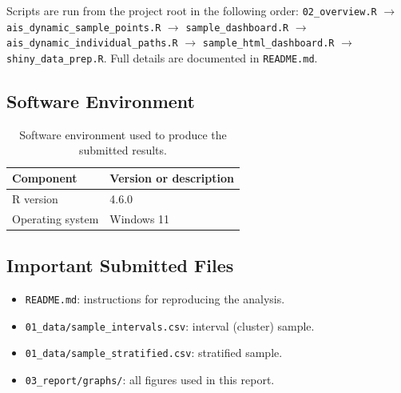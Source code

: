 \documentclass[11pt,a4paper]{article}
\begin{document}
Scripts are run from the project root in the following order:
\texttt{02\_overview.R} $\rightarrow$ \texttt{ais\_dynamic\_sample\_points.R}
$\rightarrow$ \texttt{sample\_dashboard.R} $\rightarrow$
\texttt{ais\_dynamic\_individual\_paths.R} $\rightarrow$
\texttt{sample\_html\_dashboard.R} $\rightarrow$ \texttt{shiny\_data\_prep.R}.
Full details are documented in \texttt{README.md}.

\subsection{Software Environment}

\begin{table}[h]
  \centering
  \caption{Software environment used to produce the submitted results.}
  \begin{tabular}{ll}
    \toprule
    Component & Version or description \\
    \midrule
    R version & 4.6.0 \\
    Operating system & Windows 11\\
    \bottomrule
  \end{tabular}
\end{table}

\subsection{Important Submitted Files}

\begin{itemize}[noitemsep]
  \item \texttt{README.md}: instructions for reproducing the analysis.
  \item \texttt{01\_data/sample\_intervals.csv}: interval (cluster) sample.
  \item \texttt{01\_data/sample\_stratified.csv}: stratified sample.
  \item \texttt{03\_report/graphs/}: all figures used in this report.
\end{itemize}
\end{document}
